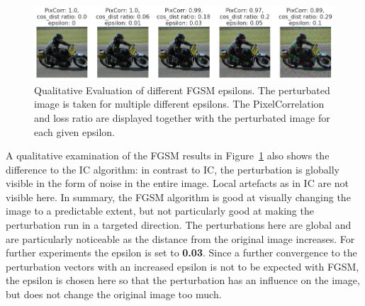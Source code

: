     \begin{figure}[ht]
        \centering
        \includegraphics[width=1\textwidth]{plots/advpert_fgsm_qual_validation_evolution.png}
        \caption[Qualitative Evaluation of different FGSM epsilons]{Qualitative Evaluation of different FGSM epsilons. The perturbated image is taken for multiple different epsilons. The PixelCorrelation and loss ratio are displayed together with the perturbated image for each given epsilon.}\label{fig:advpert_fgsm_qual_validation_evolution}
    \end{figure}
    

A qualitative examination of the FGSM results in Figure~\ref{fig:advpert_fgsm_qual_validation_evolution} also shows the difference to the IC algorithm: in contrast to IC, the perturbation is globally visible in the form of noise in the entire image. Local artefacts as in IC are not visible here. In summary, the FGSM algorithm is good at visually changing the image to a predictable extent, but not particularly good at making the perturbation run in a targeted direction. The perturbations here are global and are particularly noticeable as the distance from the original image increases. For further experiments the epsilon is set to \textbf{0.03}. Since a further convergence to the perturbation vectors with an increased epsilon is not to be expected with FGSM, the epsilon is chosen here so that the perturbation has an influence on the image, but does not change the original image too much.



